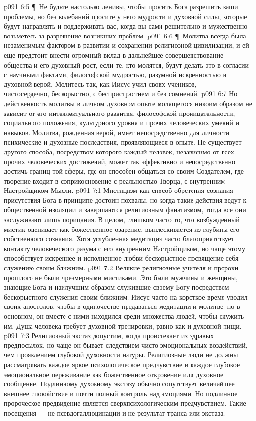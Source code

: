\vs p091 6:5 \P\ Не будьте настолько ленивы, чтобы просить Бога разрешить ваши проблемы, но без колебаний просите у него мудрости и духовной силы, которые будут направлять и поддерживать вас, когда вы сами решительно и мужественно возьметесь за разрешение возникших проблем.
\vs p091 6:6 \P\ Молитва всегда была незаменимым фактором в развитии и сохранении религиозной цивилизации, и ей еще предстоит внести огромный вклад в дальнейшее совершенствование общества и его духовный рост, если те, кто молятся, будут делать это в согласии с научными фактами, философской мудростью, разумной искренностью и духовной верой. Молитесь так, как Иисус учил своих учеников, --- чистосердечно, бескорыстно, с беспристрастием и без сомнений.
\vs p091 6:7 Но действенность молитвы в личном духовном опыте молящегося никоим образом не зависит от его интеллектуального развития, философской проницательности, социального положения, культурного уровня и прочих человеческих умений и навыков. Молитва, рожденная верой, имеет непосредственно для личности психические и духовные последствия, проявляющиеся в опыте. Не существует другого способа, посредством которого каждый человек, независимо от всех прочих человеческих достижений, может так эффективно и непосредственно достичь границ той сферы, где он способен общаться со своим Создателем, где творение входит в соприкосновение с реальностью Творца, с внутренним Настройщиком Мысли.
\vs p091 7:1 Мистицизм как способ обретения сознания присутствия Бога в принципе достоин похвалы, но когда такие действия ведут к общественной изоляции и завершаются религиозным фанатизмом, тогда все они заслуживают лишь порицания. В целом, слишком часто то, что возбужденный мистик оценивает как божественное озарение, выплескивается из глубины его собственного сознания. Хотя углубленная медитация часто благоприятствует контакту человеческого разума с его внутренним Настройщиком, но чаще этому способствует искреннее и исполненное любви бескорыстное посвящение себя служению своим ближним.
\vs p091 7:2 Великие религиозные учителя и пророки прошлого не были чрезмерными мистиками. Это были мужчины и женщины, знающие Бога и наилучшим образом служившие своему Богу посредством бескорыстного служения своим ближним. Иисус часто на короткое время уводил своих апостолов, чтобы в одиночестве предаваться медитации и молитве, но в основном, он вместе с ними находился среди множества людей, чтобы служить им. Душа человека требует духовной тренировки, равно как и духовной пищи.
\vs p091 7:3 Религиозный экстаз допустим, когда проистекает из здравых предпосылок, но чаще он бывает следствием чисто эмоциональных воздействий, чем проявлением глубокой духовности натуры. Религиозные люди не должны рассматривать каждое яркое психологическое предчувствие и каждое глубокое эмоциональное переживание как божественное откровение или духовное сообщение. Подлинному духовному экстазу обычно сопутствует величайшее внешнее спокойствие и почти полный контроль над эмоциями. Но подлинное пророческое предвидение является сверхпсихологическим предчувствием. Такие посещения --- не псевдогаллюцинации и не результат транса или экстаза.
